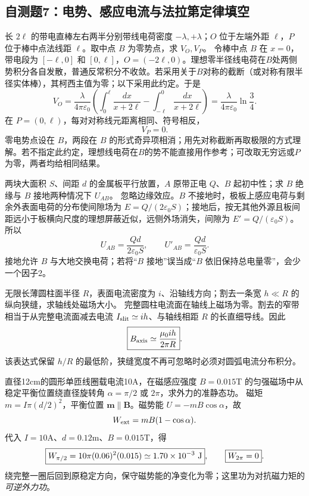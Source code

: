 \subsection{自测题7：电势、感应电流与法拉第定律填空}

\problemtext 长 $2\ell$ 的带电直棒左右两半分别带线电荷密度 $-\lambda,+\lambda$；$O$ 位于左端外距 $\ell$，$P$ 位于棒中点法线距 $\ell$。取中点 $B$ 为零势点，求 $V_O,V_P$。
\workings 令棒中点 $B$ 在 $x=0$，带电段为 $[-\ell,0]$ 和 $[0,\ell]$，$O=(-2\ell,0)$。理想零半径线电荷在$B$处两侧势积分各自发散，普通反常积分不收敛。若采用关于$B$对称的截断（或对称有限半径实体棒），其柯西主值为零；以下采用此约定。于是
\[
V_O=\frac{\lambda}{4\pi\varepsilon_0}\left(
\int_0^\ell\frac{dx}{x+2\ell}-
\int_{-\ell}^0\frac{dx}{x+2\ell}\right)
=\boxed{\frac{\lambda}{4\pi\varepsilon_0}\ln\frac34}.
\]
在 $P=(0,\ell)$，每对对称线元距离相同、符号相反，
\[\boxed{V_P=0}.\]
\crosscheck 零电势点设在 $B$，两段在 $B$ 的形式奇异项相消；用先对称截断再取极限的方式理解。若不指定此约定，理想线电荷在$B$的势不能直接用作参考；可改取无穷远或$P$为零，两者均给相同结果。

\problemtext 两块大面积 $S$、间距 $d$ 的金属板平行放置，$A$ 原带正电 $Q$、$B$ 起初中性；求 $B$ 绝缘与 $B$ 接地两种情况下 $U_{AB}$。
\workings 忽略边缘效应。$B$ 不接地时，极板上感应电荷与剩余外表面电荷的分布使间隙场为 $E=Q/(2\varepsilon_0S)$；接地后，按无其他外源且板间距远小于板横向尺度的理想屏蔽近似，远侧外场消失，间隙为 $E'=Q/(\varepsilon_0S)$。所以
\[
\boxed{U_{AB}=\frac{Qd}{2\varepsilon_0S}},\qquad
\boxed{U'_{AB}=\frac{Qd}{\varepsilon_0S}}.
\]
\crosscheck 接地允许 $B$ 与大地交换电荷；若将“$B$ 接地”误当成“$B$ 依旧保持总电量零”，会少一个因子2。

\problemtext 无限长薄圆柱面半径 $R$，表面电流密度为 $i$、沿轴线方向；割去一条宽 $h\ll R$ 的纵向狭缝，求轴线处磁场大小。
\workings 完整圆柱电流面在轴线上磁场为零。割去的窄带相当于从完整电流面减去电流 $I_{\rm slit}\simeq ih$、与轴线相距 $R$ 的长直细导线。因此
\[\boxed{B_{\rm axis}\simeq \frac{\mu_0 i h}{2\pi R}}.\]
\crosscheck 该表达式保留 $h/R$ 的最低阶，狭缝宽度不再可忽略时必须对圆弧电流分布积分。

\problemtext 直径12cm的圆形单匝线圈载电流10A，在磁感应强度 $B=0.015$T 的匀强磁场中从稳定平衡位置绕直径旋转角 $\alpha=\pi/2$ 或 $2\pi$，求外力的准静态功。
\workings 磁矩 $m=I\pi(d/2)^2$，平衡位置 $\bm m\parallel\bm B$。磁势能 $U=-mB\cos\alpha$，故
\[W_{\rm ext}=mB(1-\cos\alpha).\]
代入 $I=10$A、$d=0.12$m、$B=0.015$T，得
\[
\boxed{W_{\pi/2}=10\pi(0.06)^2(0.015)\simeq1.70\times10^{-3}\ {\rm J}},
\qquad\boxed{W_{2\pi}=0}.
\]
\crosscheck 绕完整一圈后回到原稳定方向，保守磁势能的净变化为零；这里功为对抗磁力矩的\emph{可逆外力功}。

